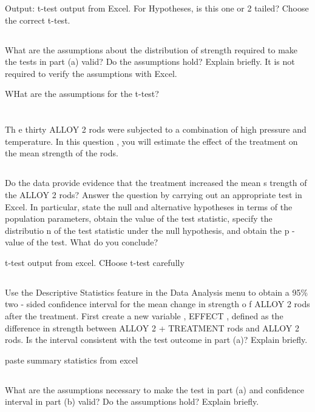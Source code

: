 \documentclass[letterpaper]{article}
\begin{document}
Output: t-test output from Excel. For Hypotheses, is this one or 2 tailed?
Choose the correct t-test.

\subsection{}%
What are the assumptions about the distribution of strength required to make the
tests in part (a) valid?  Do the assumptions hold?  Explain briefly. It is not
required to verify the assumptions with Excel.

WHat are the assumptions for the t-test?

\section{}%
Th e  thirty  ALLOY  2  rods  were  subjected  to  a  combination  of  high
pressure  and  temperature.  In  this  question , you will estimate the effect
of the treatment on the mean strength of the rods.

\subsection{}%
Do the data provide evidence that the treatment increased the mean s trength of
the ALLOY 2  rods? Answer the question by carrying out an appropriate test in
Excel.  In particular, state  the null  and alternative hypotheses in terms of
the population parameters, obtain the value of the test  statistic,  specify the
distributio n of the test statistic under the null hypothesis, and obtain the  p
- value of the test.  What do you conclude?

t-test output from excel. CHoose t-test carefully

\subsection{}%
Use the  Descriptive Statistics feature in  the  Data Analysis menu to obtain a
95\%  two - sided  confidence interval for the mean change in strength o f ALLOY
2 rods after the treatment.   First create a new variable , EFFECT , defined as
the difference in strength between ALLOY 2 + TREATMENT rods and ALLOY 2 rods. Is
the interval consistent with the  test  outcome in part  (a)? Explain briefly.

paste summary statistics from excel

\subsection{}%
What are the  assumptions necessary to make the test in part (a) and confidence
interval in part (b)  valid?  Do the assumptions hold?  Explain briefly.
\end{document}

